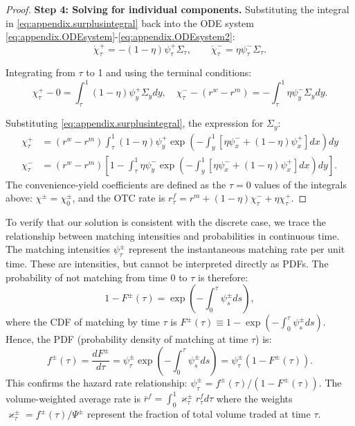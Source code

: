 \begin{proof}
\textbf{Step 4: Solving for individual components.} Substituting the integral in \eqref{eq:appendix.surplusintegral} back into the ODE system \eqref{eq:appendix.ODEsystem}-\eqref{eq:appendix.ODEsystem2}:
\begin{equation*}
\dot{\chi}_{\tau}^{+} = -(1-\eta)\psi_{\tau}^{+}\Sigma_{\tau}, \quad\quad
\dot{\chi}_{\tau}^{-} = \eta\psi_{\tau}^{-}\Sigma_{\tau}.
\end{equation*}

Integrating from $\tau$ to 1 and using the terminal conditions:
\begin{equation*}
\chi_{\tau}^{+} - 0 = \int_{\tau}^{1}(1-\eta)\psi_{y}^{+}\Sigma_{y}dy,\quad
\chi_{\tau}^{-} - (r^{w} - r^{m}) = -\int_{\tau}^{1}\eta\psi_{y}^{-}\Sigma_{y}dy.
\end{equation*}

Substituting \eqref{eq:appendix.surplusintegral}, the expression for $\Sigma_y$:
\begin{align*}
\chi_{\tau}^{+} &= (r^{w} - r^{m})\int_{\tau}^{1}(1-\eta)\psi_{y}^{+}\exp\left(-\int_{y}^{1}[\eta\psi_{x}^{-} + (1-\eta)\psi_{x}^{+}]dx\right)dy\\
\chi_{\tau}^{-} &= (r^{w} - r^{m})\left[1 - \int_{\tau}^{1}\eta\psi_{y}^{-}\exp\left(-\int_{y}^{1}[\eta\psi_{x}^{-} + (1-\eta)\psi_{x}^{+}]dx\right)dy\right].
\end{align*}
The convenience-yield coefficients are defined as the $\tau=0$ values of the integrals above: $\chi^{\pm} = \chi_{0}^{\pm}$, and the OTC rate is $r_{\tau}^{f} = r^{m} + (1-\eta)\chi_{\tau}^{-} + \eta\chi_{\tau}^{+}$.
\end{proof}

To verify that our solution is consistent with the discrete case, we trace the relationship between matching intensities and probabilities in continuous time. The matching intensities $\psi_{\tau}^{\pm}$ represent the instantaneous matching rate per unit time. These are intensities, but cannot be interpreted directly as PDFs. The probability of not matching from time 0 to $\tau$ is therefore:
\[
1-F^{\pm}(\tau) = \exp\left(-\int_0^{\tau} \psi_s^{\pm} ds\right),
\]
where the CDF of matching by time $\tau$ is $F^{\pm}(\tau) \equiv 1 - \exp\left(-\int_0^{\tau} \psi_s^{\pm} ds\right)$. Hence, the PDF (probability density of matching at time $\tau$) is:
\[
f^{\pm}(\tau) = \frac{dF^{\pm}}{d\tau} = \psi_{\tau}^{\pm} \exp\left(-\int_0^{\tau} \psi_s^{\pm} ds\right) = \psi_{\tau}^{\pm}(1 - F^{\pm}(\tau)).
\]
This confirms the hazard rate relationship: $\psi_{\tau}^{\pm} = f^{\pm}(\tau)/(1-F^{\pm}(\tau))$.
The volume-weighted average rate is $\overline{r}^{f} = \int_0^1 \varkappa_{\tau}^{\pm} r_{\tau}^{f} d\tau$ where the weights $\varkappa_{\tau}^{\pm} = f^{\pm}(\tau)/\Psi^{\pm}$ represent the fraction of total volume traded at time $\tau$.

